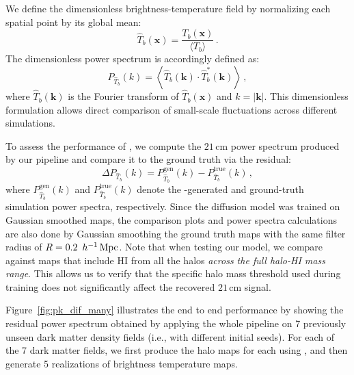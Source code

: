 We define the dimensionless brightness-temperature field by normalizing each spatial point by its global mean:
\begin{equation}
  \hat{T}_b(\bm{x}) = \frac{T_b(\bm{x})}{\langle T_b \rangle}\,.
\end{equation}
The dimensionless power spectrum is accordingly defined as:
\begin{equation}
  P_{\hat{T}_b}(k) = \left\langle \hat{T}_b(\bm{k}) \cdot \hat{T}_b^{*}(\bm{k}) \right\rangle\,,
\end{equation}
where $\hat{T}_b(\bm{k})$ is the Fourier transform of $\hat{T}_b(\bm{x})$ and
$k = |\bm{k}|$. This dimensionless formulation allows direct comparison of small-scale fluctuations across different simulations.

To assess the performance of \LODI, we compute the $21\,\mathrm{cm}$ power spectrum produced by our pipeline and compare it to the ground truth via the residual:
\begin{equation}
  \Delta P_{\hat{T}_b}(k) = P_{\hat{T}_b}^{\mathrm{gen}}(k) - P_{\hat{T}_b}^{\mathrm{true}}(k)\,,
\end{equation}
where $P_{\hat{T}_b}^{\mathrm{gen}}(k)$ and $P_{\hat{T}_b}^{\mathrm{true}}(k)$
denote the \LODI-generated and ground-truth simulation power spectra,
respectively. Since the diffusion model was trained on Gaussian smoothed maps, the comparison plots and power spectra calculations are also done by Gaussian smoothing the ground truth maps with the same filter radius of $R = 0.2 ~\,h^{-1}\,\mathrm{Mpc}$. Note that when testing our model, we compare against maps that include HI from all the halos \emph{across the full halo-HI mass range}. This allows us to verify
that the specific halo mass threshold used during training does not
significantly affect the recovered $21\,\mathrm{cm}$ signal.

Figure~\ref{fig:pk_dif_many} illustrates the end to end performance by showing the residual power spectrum obtained by applying the whole pipeline on 7 previously unseen dark matter density fields (i.e., with different initial seeds). For each of the 7 dark matter fields, we first produce the halo maps for each using \HALOgen, and then generate 5 realizations of brightness temperature maps.

